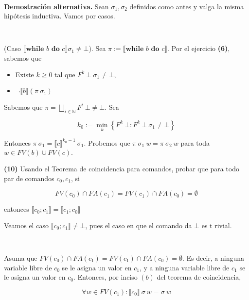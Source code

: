 \documentclass[a4paper, 12pt]{article}
\begin{document}
~

\textbf{Demostración alternativa.} Sean $\sigma_1, \sigma_2$ definidos como
antes y valga la misma hipótesis inductiva. Vamos por casos.

~

(Caso $\llbracket \textbf{while } b \textbf{ do } c\rrbracket \sigma_1 \neq \bot
$). Sea $\pi := \llbracket \textbf{while } b \textbf{ do } c\rrbracket$.
Por el ejercicio \textbf{(6)}, sabemos que 

\begin{itemize}
  \item Existe $k \geq 0$ tal que $F^k ~ \bot
~ \sigma_1 \neq \bot $, 
  \item $\neg\llbracket b \rrbracket(\pi ~ \sigma_1)$
\end{itemize}

Sabemos que $\pi = \bigsqcup_{i \in \mathbb{N}} F^i ~ \bot \neq \bot $. Sea 

\begin{equation*}
  k_0 := \min_{k} \left\{ F^k ~ \bot : F^k ~ \bot ~ \sigma_1 \neq \bot  \right\} 
\end{equation*}

Entonces $\pi ~ \sigma_1 = \llbracket c \rrbracket^{k_0-1} ~ \sigma_1$. Probemos
que $\pi ~ \sigma_1 ~ w = \pi ~ \sigma_2 ~ w$ para toda $w \in FV(b) \cup
FV(c)$. 
~
\pagebreak 

\begin{myframe}
\textbf{(10)} Usando el Teorema de coincidencia para comandos, probar que para
todo par de comandos $c_0, c_1$, si 

\begin{equation*}
  FV(c_0) \cap FA(c_1) = FV(c_1) \cap FA(c_0) = \emptyset
\end{equation*}

entonces $\llbracket c_0;c_1 \rrbracket = \llbracket c_1;c_0 \rrbracket$
\end{myframe}


Veamos el caso $\llbracket c_0;c_1\rrbracket\neq \bot $, pues el caso en que el
comando da $\bot $ es t rivial.

~ 

Asuma que $FV(c_0) \cap FA(c_1) = FV(c_1) \cap FA(c_0) = \emptyset$. Es decir, a
ninguna variable libre de $c_0$ se le asigna un valor en $c_1$, y a ninguna
variable libre de $c_1$ se le asigna un valor en $c_0$. Entonces, por inciso
$(b)$ del teorema de coincidencia,

\begin{equation*}
  \forall  w \in FV(c_1) : \llbracket c_0 \rrbracket ~ \sigma ~ w = \sigma ~ w
\end{equation*}
\end{document}
